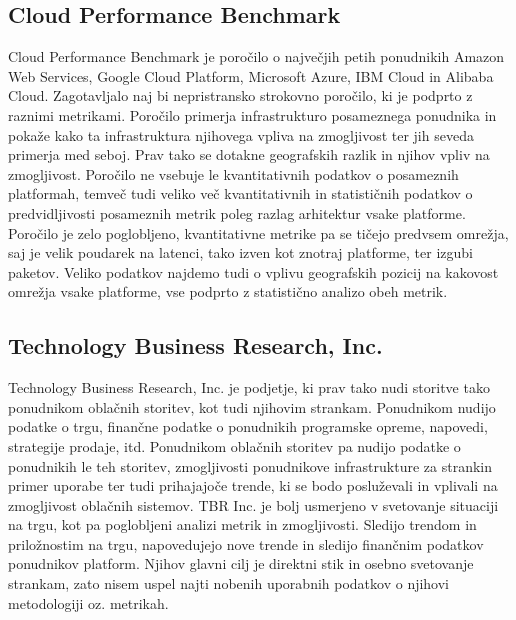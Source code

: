 \subsection{Cloud Performance Benchmark}

Cloud Performance Benchmark je poročilo o največjih petih ponudnikih Amazon Web Services, Google Cloud Platform, Microsoft Azure, IBM Cloud in Alibaba Cloud. Zagotavljalo naj bi nepristransko strokovno poročilo, ki je podprto z raznimi metrikami. Poročilo primerja infrastrukturo posameznega ponudnika in pokaže kako ta infrastruktura njihovega vpliva na zmogljivost ter jih seveda primerja med seboj. Prav tako se dotakne geografskih razlik in njihov vpliv na zmogljivost.
Poročilo ne vsebuje le kvantitativnih podatkov o posameznih platformah, temveč tudi veliko več kvantitativnih in statističnih podatkov o predvidljivosti posameznih metrik poleg razlag arhitektur vsake platforme. Poročilo je zelo poglobljeno, kvantitativne metrike pa se tičejo predvsem omrežja, saj je velik poudarek na latenci, tako izven kot znotraj platforme, ter izgubi paketov. Veliko podatkov najdemo tudi o vplivu geografskih pozicij na kakovost omrežja vsake platforme, vse podprto z statistično analizo obeh metrik.

\subsection{Technology Business Research, Inc.}

Technology Business Research, Inc. je podjetje, ki prav tako nudi storitve tako ponudnikom oblačnih storitev, kot tudi njihovim strankam. Ponudnikom nudijo podatke o trgu, finančne podatke o ponudnikih programske opreme, napovedi, strategije prodaje, itd. Ponudnikom oblačnih storitev pa nudijo podatke o ponudnikih le teh storitev, zmogljivosti ponudnikove infrastrukture za strankin primer uporabe ter tudi prihajajoče trende, ki se bodo posluževali in vplivali na zmogljivost oblačnih sistemov.
TBR Inc. je bolj usmerjeno v svetovanje situaciji na trgu, kot pa poglobljeni analizi metrik in zmogljivosti. Sledijo trendom in priložnostim na trgu, napovedujejo nove trende in sledijo finančnim podatkov ponudnikov platform. Njihov glavni cilj je direktni stik in osebno svetovanje strankam, zato nisem uspel najti nobenih uporabnih podatkov o njihovi metodologiji oz. metrikah.



